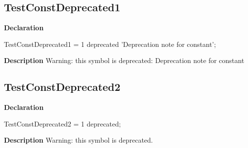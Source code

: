 \documentclass{report}
\begin{document}
\subsection*{TestConstDeprecated1}
\begin{list}{}{
\setlength{\itemindent}{0cm}
\setlength{\listparindent}{0cm}
\setlength{\leftmargin}{\evensidemargin}
\addtolength{\leftmargin}{\tmplength}
\settowidth{\labelsep}{X}
\addtolength{\leftmargin}{\labelsep}
\setlength{\labelwidth}{\tmplength}
}
\begin{flushleft}
\item[\textbf{Declaration}\hfill]
\begin{ttfamily}
TestConstDeprecated1 = 1 deprecated 'Deprecation note for constant';\end{ttfamily}


\end{flushleft}
\par
\item[\textbf{Description}]
Warning: this symbol is deprecated: Deprecation note for constant

 

\end{list}
\subsection*{TestConstDeprecated2}
\begin{list}{}{
\setlength{\itemindent}{0cm}
\setlength{\listparindent}{0cm}
\setlength{\leftmargin}{\evensidemargin}
\addtolength{\leftmargin}{\tmplength}
\settowidth{\labelsep}{X}
\addtolength{\leftmargin}{\labelsep}
\setlength{\labelwidth}{\tmplength}
}
\begin{flushleft}
\item[\textbf{Declaration}\hfill]
\begin{ttfamily}
TestConstDeprecated2 = 1 deprecated;\end{ttfamily}


\end{flushleft}
\par
\item[\textbf{Description}]
Warning: this symbol is deprecated.

 

\end{list}
\end{document}
